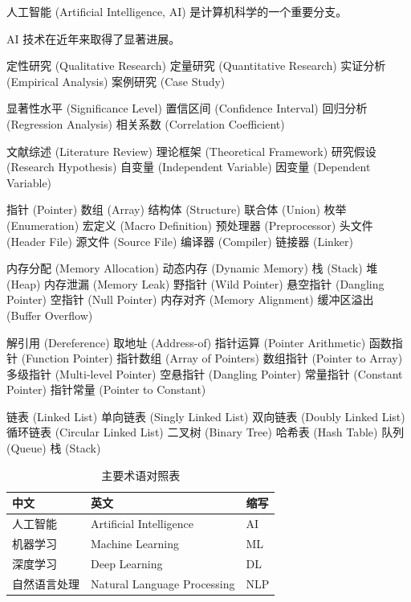 

人工智能 (Artificial Intelligence, AI) 是计算机科学的一个重要分支。

AI 技术在近年来取得了显著进展。



定性研究 (Qualitative Research)
定量研究 (Quantitative Research)
实证分析 (Empirical Analysis)
案例研究 (Case Study)

显著性水平 (Significance Level)
置信区间 (Confidence Interval)
回归分析 (Regression Analysis)
相关系数 (Correlation Coefficient)

文献综述 (Literature Review)
理论框架 (Theoretical Framework)
研究假设 (Research Hypothesis)
自变量 (Independent Variable)
因变量 (Dependent Variable)

指针 (Pointer)
数组 (Array)
结构体 (Structure)
联合体 (Union)
枚举 (Enumeration)
宏定义 (Macro Definition)
预处理器 (Preprocessor)
头文件 (Header File)
源文件 (Source File)
编译器 (Compiler)
链接器 (Linker)

内存分配 (Memory Allocation)
动态内存 (Dynamic Memory)
栈 (Stack)
堆 (Heap)
内存泄漏 (Memory Leak)
野指针 (Wild Pointer)
悬空指针 (Dangling Pointer)
空指针 (Null Pointer)
内存对齐 (Memory Alignment)
缓冲区溢出 (Buffer Overflow)

解引用 (Dereference)
取地址 (Address-of)
指针运算 (Pointer Arithmetic)
函数指针 (Function Pointer)
指针数组 (Array of Pointers)
数组指针 (Pointer to Array)
多级指针 (Multi-level Pointer)
空悬指针 (Dangling Pointer)
常量指针 (Constant Pointer)
指针常量 (Pointer to Constant)

链表 (Linked List)
单向链表 (Singly Linked List)
双向链表 (Doubly Linked List)
循环链表 (Circular Linked List)
二叉树 (Binary Tree)
哈希表 (Hash Table)
队列 (Queue)
栈 (Stack)


\begin{table}[H]
  \centering
  \caption{主要术语对照表}
  \label{tab:glossary}
  \begin{tabular}{lll}
    \toprule
    \textbf{中文} & \textbf{英文} & \textbf{缩写} \\
    \midrule
    人工智能 & Artificial Intelligence & AI \\
    机器学习 & Machine Learning & ML \\
    深度学习 & Deep Learning & DL \\
    自然语言处理 & Natural Language Processing & NLP \\
    \bottomrule
  \end{tabular}
\end{table}
